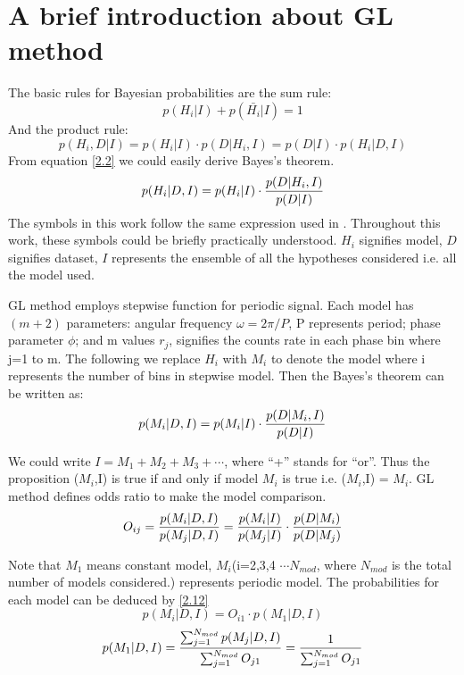 \documentclass[twoside,twocolumn]{aastex63}
\begin{document}
\clearpage
\newpage

\appendix
\section{A brief introduction about GL method}\label{GL}
The basic rules for Bayesian probabilities are the sum rule:
\begin{equation}
p(H_i|I)+p(\bar{H_i}|I)	=1
\end{equation}
\indent
And the product rule:
\begin{equation}\label{2.2}
p(H_i,D|I)=p(H_i|I)\cdot p(D|H_i,I)=p(D|I)\cdot p(H_i|D,I)
\end{equation}
\indent
From equation \ref{2.2} we could easily derive Bayes's theorem.
\begin{equation}\label{2.5} 
p(H_i|D,I)=p(H_i|I)\cdot {p(D|H_i,I)\over p(D|I)}
\end{equation}
\indent
The symbols in this work follow the same expression used in \citep{1992ApJ...398..146G}. Throughout this work, these symbols could be briefly practically understood. $H_i$ signifies model, $D$ signifies dataset, $I$ represents the ensemble of all the hypotheses considered i.e. all the model used.

 GL method employs stepwise function for periodic signal. Each model has $(m+2)$ parameters: angular frequency $\omega={2\pi/P}$, P represents period; phase parameter $\phi$; and m values $r_j$, signifies the counts rate in each phase bin where j=1 to m. The following we replace $H_i$ with $M_i$ to denote the model where i represents the number of bins in stepwise model. Then the Bayes's theorem can be written as:
 \begin{equation}\label{2.11}
 p(M_i|D,I)=p(M_i|I)\cdot {p(D|M_i,I)\over p(D|I)}
 \end{equation}
 
We could write $I=M_1+M_2+M_3+\cdots$, where ``+'' stands for ``or''. Thus the proposition ($M_i$,I) is true if and only if model $M_i$ is true i.e. ($M_i$,I) = $M_i$. GL method defines odds ratio to make the model comparison.
\begin{equation}\label{2.12}
O_{ij}={p(M_i|D,I)\over p(M_j|D,I)}={p(M_i|I)\over p(M_j|I)}\cdot {p(D|M_i)\over p(D|M_j)}
\end{equation}

Note that $M_1$ means constant model, $M_i$(i=2,3,4 $\cdots N_{mod}$, where $N_{mod}$ is the total number of models considered.) represents periodic model. The probabilities for each model can be deduced by \ref{2.12}
\begin{equation}\label{6}
p(M_i|D,I)=O_{i1}\cdot p(M_1|D,I)
\end{equation}
\begin{equation}\label{7}
p(M_1|D,I)={{\sum_{j=1}^{N_{mod}} p(M_j|D,I)}\over {\sum_{j=1}^{N_{mod}} O_{j1}}}
={1\over {\sum_{j=1}^{N_{mod}} O_{j1}}}	
\end{equation}
\end{document}
